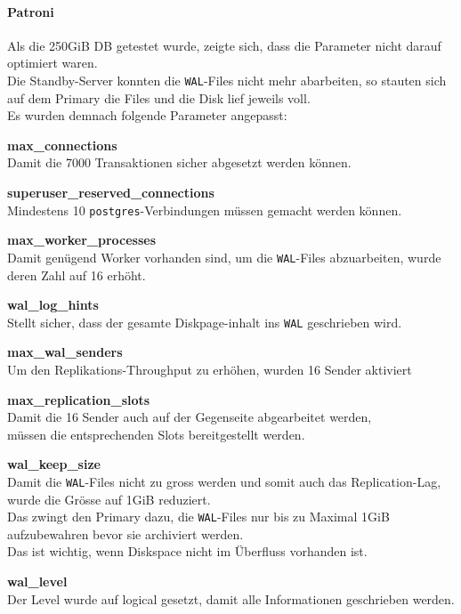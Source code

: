 \begin{flushleft}
    \paragraph{Patroni}
    Als die 250GiB DB getestet wurde, zeigte sich, dass die Parameter nicht darauf optimiert waren.\\
    Die Standby-Server konnten die \texttt{WAL}-Files nicht mehr abarbeiten, so stauten sich auf dem Primary die Files und die Disk lief jeweils voll.\\
    Es wurden demnach folgende Parameter angepasst:
    \begin{description}
        \item \textbf{max\_connections}\hfill \\Damit die 7000 Transaktionen sicher abgesetzt werden können.
        \item \textbf{superuser\_reserved\_connections}\hfill \\Mindestens 10 \texttt{postgres}-Verbindungen müssen gemacht werden können.
        \item \textbf{max\_worker\_processes}\hfill \\Damit genügend Worker vorhanden sind, um die \texttt{WAL}-Files abzuarbeiten, wurde deren Zahl auf 16 erhöht.
        \item \textbf{wal\_log\_hints}\hfill \\Stellt sicher, dass der gesamte Diskpage-inhalt ins \texttt{WAL} geschrieben wird.
        \item \textbf{max\_wal\_senders}\hfill \\Um den Replikations-Throughput zu erhöhen, wurden 16 Sender aktiviert
        \item \textbf{max\_replication\_slots}\hfill \\Damit die 16 Sender auch auf der Gegenseite abgearbeitet werden,\\müssen die entsprechenden Slots bereitgestellt werden.
        \item \textbf{wal\_keep\_size}\hfill \\Damit die \texttt{WAL}-Files nicht zu gross werden und somit auch das Replication-Lag,\\wurde die Grösse auf 1GiB reduziert.\\Das zwingt den Primary dazu, die \texttt{WAL}-Files nur bis zu Maximal 1GiB aufzubewahren bevor sie archiviert werden.\\Das ist wichtig, wenn Diskspace nicht im Überfluss vorhanden ist.
        \item \textbf{wal\_level}\hfill \\Der Level wurde auf logical gesetzt, damit alle Informationen geschrieben werden.

\end{description}
\end{flushleft}
